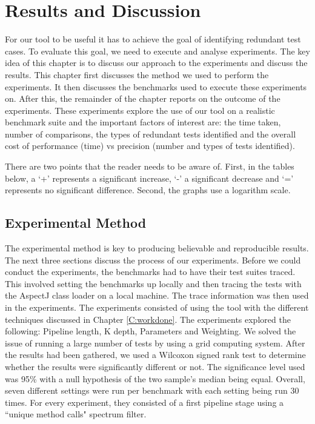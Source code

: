 \chapter{Results and Discussion}\label{C:results}\label{C:evaluation}

For our tool to be useful it has to achieve the goal of identifying redundant test cases. To evaluate this goal, we need to execute and analyse experiments. The key idea of this chapter is to discuss our approach to the experiments and discuss the results. This chapter first discusses the method we used to perform the experiments. It then discusses the benchmarks used to execute these experiments on. After this, the remainder of the chapter reports on the outcome of the experiments. These experiments explore the use of our tool on a realistic benchmark suite and the important factors of interest are: the time taken, number of comparisons, the types of redundant tests identified and the overall cost of performance (time) vs precision (number and types of tests identified).

There are two points that the reader needs to be aware of. First, in the tables below, a `+' represents a significant increase, `-' a significant decrease and `=' represents no significant difference. Second, the graphs use a logarithm scale.

\section{Experimental Method}

The experimental method is key to producing believable and reproducible results. The next three sections discuss the process of our experiments. Before we could conduct the experiments, the benchmarks had to have their test suites traced. This involved setting the benchmarks up locally and then tracing the tests with the AspectJ class loader on a local machine. The trace information was then used in the experiments. The experiments consisted of using the tool with the different techniques discussed in Chapter \ref{C:workdone}. The experiments explored the following: Pipeline length, K depth, Parameters and Weighting. We solved the issue of running a large number of tests by using a grid computing system. After the results had been gathered, we used a Wilcoxon signed rank test \cite{wilcoxon1945individual} to determine whether the results were significantly different or not. The significance level used was 95\% with a null hypothesis of the two sample's median being equal. Overall, seven different settings were run per benchmark with each setting being run 30 times. For every experiment, they consisted of a first pipeline stage using a ``unique method calls" spectrum filter. 

